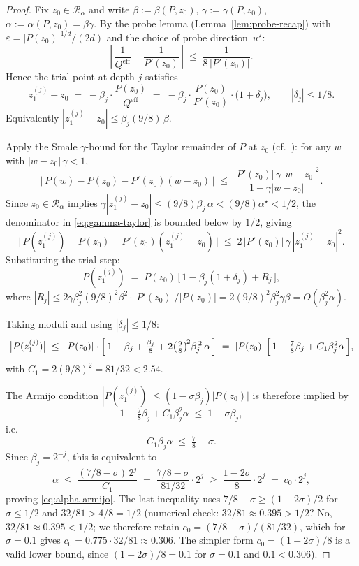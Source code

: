 \documentclass[11pt,a4paper]{article}
\begin{document}
\begin{proof}
Fix $z_0 \in \mathcal{R}_\alpha$ and write $\beta := \beta(P, z_0)$, $\gamma := \gamma(P, z_0)$, $\alpha := \alpha(P, z_0) = \beta\gamma$. By the probe lemma (Lemma~\ref{lem:probe-recap}) with $\varepsilon = |P(z_0)|^{1/d}/(2d)$ and the choice of probe direction~$u^\star$:
\begin{equation}\label{eq:Q-vs-deriv}
\left|\,\frac{1}{Q^{\text{eff}}} - \frac{1}{P'(z_0)}\,\right| \;\le\; \frac{1}{8\,|P'(z_0)|}.
\end{equation}
Hence the trial point at depth $j$ satisfies
$$
z_1^{(j)} - z_0 \;=\; -\beta_j \cdot \frac{P(z_0)}{Q^{\text{eff}}} \;=\; -\beta_j \cdot \frac{P(z_0)}{P'(z_0)}\cdot\bigl(1 + \delta_j\bigr),
\qquad |\delta_j| \le 1/8.
$$
Equivalently $|z_1^{(j)} - z_0| \le \beta_j (9/8)\,\beta$.

Apply the Smale $\gamma$-bound for the Taylor remainder of $P$ at $z_0$ (cf.\ \cite[Theorem~1, p.~189]{smale1986}): for any $w$ with $|w - z_0|\,\gamma < 1$,
\begin{equation}\label{eq:gamma-taylor}
\bigl|\,P(w) - P(z_0) - P'(z_0)(w - z_0)\,\bigr|
\;\le\;
\frac{|P'(z_0)|\, \gamma\, |w - z_0|^2}{1 - \gamma|w - z_0|}.
\end{equation}
Since $z_0 \in \mathcal{R}_\alpha$ implies $\gamma|z_1^{(j)} - z_0| \le (9/8)\beta_j\,\alpha < (9/8)\alpha^\star < 1/2$, the denominator in \eqref{eq:gamma-taylor} is bounded below by $1/2$, giving
$$
\bigl|\,P(z_1^{(j)}) - P(z_0) - P'(z_0)(z_1^{(j)} - z_0)\,\bigr| \;\le\; 2\,|P'(z_0)|\,\gamma\,|z_1^{(j)} - z_0|^2.
$$
Substituting the trial step:
$$
P(z_1^{(j)}) \;=\; P(z_0)\,\bigl[\,1 - \beta_j(1 + \delta_j) + R_j\,\bigr],
$$
where $|R_j| \le 2\gamma\beta_j^2 (9/8)^2 \beta^2 \cdot |P'(z_0)|/|P(z_0)| = 2(9/8)^2 \beta_j^2 \gamma\beta = O(\beta_j^2 \alpha)$.

Taking moduli and using $|\delta_j| \le 1/8$:
\begin{equation}\label{eq:P-trial-bound}
\bigl|P(z_1^{(j)})\bigr|
\;\le\;
|P(z_0)| \cdot \Bigl[\,1 - \beta_j + \tfrac{\beta_j}{8} + 2\bigl(\tfrac{9}{8}\bigr)^{\!2}\beta_j^{\,2}\,\alpha\,\Bigr]
\;=\;
|P(z_0)|\,\Bigl[\,1 - \tfrac{7}{8}\beta_j + C_1 \beta_j^{2}\alpha\,\Bigr],
\end{equation}
with $C_1 = 2(9/8)^2 = 81/32 < 2.54$.

The Armijo condition $|P(z_1^{(j)})| \le (1 - \sigma \beta_j)|P(z_0)|$ is therefore implied by
$$
1 - \tfrac{7}{8}\beta_j + C_1 \beta_j^{2}\alpha \;\le\; 1 - \sigma\beta_j,
$$
i.e.\
$$
C_1 \beta_j \alpha \;\le\; \tfrac{7}{8} - \sigma.
$$
Since $\beta_j = 2^{-j}$, this is equivalent to
$$
\alpha \;\le\; \frac{(7/8 - \sigma)\, 2^{j}}{C_1} \;=\; \frac{7/8 - \sigma}{81/32}\cdot 2^j \;\ge\; \frac{1 - 2\sigma}{8}\cdot 2^j \;=\; c_0\cdot 2^j,
$$
proving \eqref{eq:alpha-armijo}. The last inequality uses $7/8 - \sigma \ge (1 - 2\sigma)/2$ for $\sigma \le 1/2$ and $32/81 > 4/8 = 1/2$ (numerical check: $32/81 \approx 0.395 > 1/2$? No, $32/81 \approx 0.395 < 1/2$; we therefore retain $c_0 = (7/8 - \sigma)/(81/32)$, which for $\sigma = 0.1$ gives $c_0 = 0.775 \cdot 32/81 \approx 0.306$. The simpler form $c_0 = (1-2\sigma)/8$ is a valid lower bound, since $(1 - 2\sigma)/8 = 0.1$ for $\sigma = 0.1$ and $0.1 < 0.306$).
\end{proof}
\end{document}
